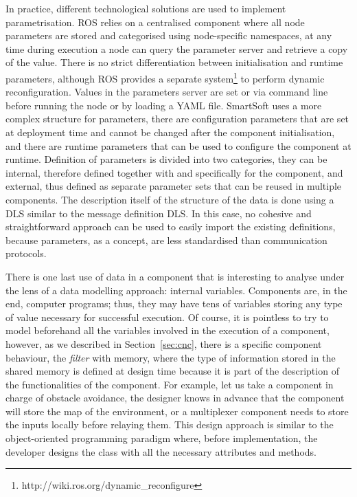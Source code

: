 In practice, different technological solutions are used to implement parametrisation. ROS relies on a centralised component where all node parameters are stored and categorised using node-specific namespaces, at any time during execution a node can query the parameter server and retrieve a copy of the value. There is no strict differentiation between initialisation and runtime parameters, although ROS provides a separate system\footnote{http://wiki.ros.org/dynamic\_reconfigure} to perform dynamic reconfiguration. Values in the parameters server are set or via command line before running the node or by loading a YAML file. SmartSoft uses a more complex structure for parameters, there are configuration parameters that are set at deployment time and cannot be changed after the component initialisation, and there are runtime parameters that can be used to configure the component at runtime. Definition of parameters is divided into two categories, they can be internal, therefore defined together with and specifically for the component, and external, thus defined as separate parameter sets that can be reused in multiple components. The description itself of the structure of the data is done using a DLS similar to the message definition DLS. In this case, no cohesive and straightforward approach can be used to easily import the existing definitions, because parameters, as a concept, are less standardised than communication protocols.

There is one last use of data in a component that is interesting to analyse under the lens of a data modelling approach: internal variables. Components are, in the end, computer programs; thus, they may have tens of variables storing any type of value necessary for successful execution. Of course, it is pointless to try to model beforehand all the variables involved in the execution of a component, however, as we described in Section~\ref{sec:cnc}, there is a specific component behaviour, the \textit{filter} with memory, where the type of information stored in the shared memory is defined at design time because it is part of the description of the functionalities of the component. For example, let us take a component in charge of obstacle avoidance, the designer knows in advance that the component will store the map of the environment, or a multiplexer component needs to store the inputs locally before relaying them. This design approach is similar to the object-oriented programming paradigm where, before implementation, the developer designs the class with all the necessary attributes and methods. 

